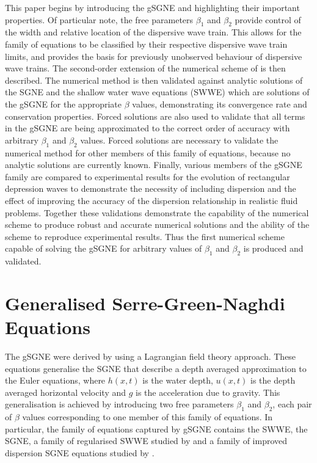 \documentclass[10pt]{elsarticle}
\begin{document}
This paper begins by introducing the gSGNE and highlighting their important properties. Of particular note, the free parameters $\beta_1$ and $\beta_2$ provide control of the width and relative location of the dispersive wave train. This allows for the family of equations to be classified by their respective dispersive wave train limits, and provides the basis for previously unobserved behaviour of dispersive wave trains. The second-order extension of the numerical scheme of \citet{Zoppou-etal-2017} is then described. The numerical method is then validated against analytic solutions of the SGNE and the shallow water wave equations (SWWE) which are solutions of the gSGNE for the appropriate $\beta$ values, demonstrating its convergence rate and conservation properties. Forced solutions are also used to validate that all terms in the gSGNE are being approximated to the correct order of accuracy with arbitrary $\beta_1$ and $\beta_2$ values. Forced solutions are necessary to validate the numerical method for other members of this family of equations, because no analytic solutions are currently known. Finally, various members of the gSGNE family are compared to experimental results for the evolution of rectangular depression waves to demonstrate the necessity of including dispersion and the effect of improving the accuracy of the dispersion relationship in realistic fluid problems. Together these validations demonstrate the capability of the numerical scheme to produce robust and accurate numerical solutions and the ability of the scheme to reproduce experimental results. Thus the first numerical scheme capable of solving the gSGNE for arbitrary values of $\beta_1$ and $\beta_2$ is produced and validated. 

\section{Generalised Serre-Green-Naghdi Equations}
The gSGNE were derived by \citet{Clamond-Dutykh-2018-237} using a Lagrangian field theory approach. These equations generalise the SGNE that describe a depth averaged approximation to the Euler equations, where $h(x,t)$ is the water depth, $u(x,t)$ is the depth averaged horizontal velocity and $g$ is the acceleration due to gravity. This generalisation is achieved by introducing two free parameters $\beta_1$ and $\beta_2$, each pair of $\beta$ values corresponding to one member of this family of equations. In particular, the family of equations captured by gSGNE contains the SWWE, the SGNE, a family of regularised SWWE studied by \citet{Clamond-Dutykh-2018-237} and a family of improved dispersion SGNE equations studied by \citet{Clamond-et.al-2017-245}.
\end{document}
